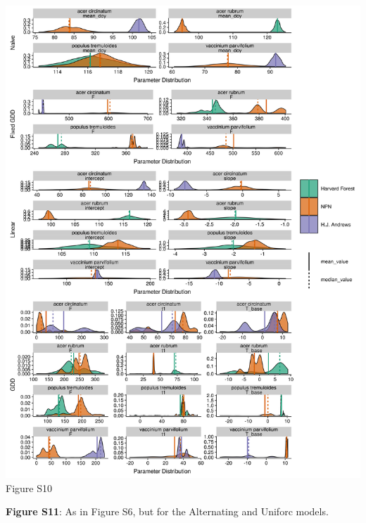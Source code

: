 \documentclass[a4paper,12pt]{article}
\begin{document}
\begin{center}
	\centering
		\includegraphics[scale=0.5]{supplement_select_species_param_comparison1.png}
	Figure S10
\end{center}

\newpage

\textbf{Figure S11}: As in Figure S6, but for the Alternating and Uniforc models. 

\newpage
\end{document}
